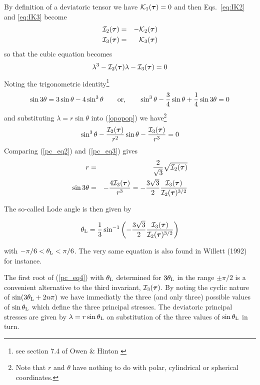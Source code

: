 By definition of a deviatoric tensor we have ${\cal K}_1({\bm \tau})=0$ and 
then Eqs.~\eqref{eq:IK2} and \eqref{eq:IK3} become
\begin{eqnarray}
{\cal I}_2({\bm \tau}) &=&  - {\cal K}_2({\bm \tau}) \\
{\cal I}_3({\bm \tau}) &=&  {\cal K}_3({\bm \tau}) 
\end{eqnarray}
so that the cubic equation becomes
\begin{equation} 
\lambda^3 -  {\cal I}_2({\bm \tau}) \lambda -  {\cal I}_3({\bm \tau}) =0 \label{opopop}
\end{equation}
Noting the trigonometric identity\footnote{see section 7.4 of Owen \& Hinton \cite{owhi}}
\begin{equation}
\sin 3\theta = 3 \sin \theta - 4 \sin^3 \theta
\qquad
{\rm or,}
\qquad
\sin^3 \theta - \frac{3}{4}\sin \theta + \frac{1}{4} \sin 3\theta = 0\label{pc_eq2}
\end{equation}
and substituting $\lambda=r\sin \theta$ into (\ref{opopop}) we have\footnote{Note that $r$ and $\theta$ have nothing 
to do with polar, cylindrical or spherical coordinates.}
\begin{equation}
\sin^3 \theta -\frac{ {\cal I}_2({\bm \tau})   }{r^2} \sin \theta -\frac{ {\cal I}_3({\bm \tau})  }{r^3}=0\label{pc_eq3}
\end{equation}
Comparing (\ref{pc_eq2}) and (\ref{pc_eq3}) gives
\begin{eqnarray}
r&=&\frac{2}{\sqrt{3}}\sqrt{ {\cal I}_2({\bm \tau})  }\label{pc_eq4bis} \\
\sin 3 \theta &=& -\frac{4 {\cal I}_3({\bm \tau})  }{r^3}=-\frac{3\sqrt{3}}{2}\frac{ {\cal I}_3({\bm \tau}) }{ {\cal I}_2({\bm \tau}) ^{3/2}} \label{pc_eq4}
\end{eqnarray}

The so-called Lode angle  \cite{zico74} is then given by 
\begin{mdframed}[backgroundcolor=blue!5]
\begin{equation}
\theta_{\rm L}=\frac{1}{3} \sin^{-1} 
\left( -\frac{3\sqrt{3}}{2} \frac{{\cal I}_3({\bm \tau})}{{\cal I}_2({\bm \tau})^{3/2}} \right)
\label{eq:lodang}
\end{equation}
\end{mdframed}
with $-\pi/6 <\theta_{\rm L} <\pi/6 $. The very same equation is 
also found in Willett (1992) \cite{will92} for instance.

The first root of (\ref{pc_eq4}) with $\theta_{\rm L}$ determined for $3\theta_{\rm L}$ in the 
range $\pm \pi/2$ is a convenient alternative to the third invariant, ${\cal I}_3({\bm \tau})$. 
By noting the cyclic nature of $\sin (3\theta_{\rm L}+2n \pi)$ we have immediatly the three 
(and only three) possible values of $\sin \theta_{\rm L} $ which define the three principal stresses. 
The deviatoric principal stresses are given by $\lambda=r \sin \theta_{\rm L}$ on substitution 
of the three values of $\sin \theta_{\rm L}$ in turn. 

